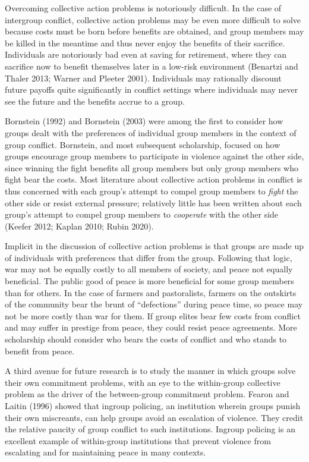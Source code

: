 \documentclass[11pt]{article}
\begin{document}
Overcoming collective action problems is notoriously difficult. In the
case of intergroup conflict, collective action problems may be even more
difficult to solve because costs must be born before benefits are
obtained, and group members may be killed in the meantime and thus never
enjoy the benefits of their sacrifice. Individuals are notoriously bad
even at saving for retirement, where they can sacrifice now to benefit
themselves later in a low-risk environment (Benartzi and Thaler 2013;
Warner and Pleeter 2001). Individuals may rationally discount future
payoffs quite significantly in conflict settings where individuals may
never see the future and the benefits accrue to a group.

Bornstein (1992) and Bornstein (2003) were among the first to consider
how groups dealt with the preferences of individual group members in the
context of group conflict. Bornstein, and most subsequent scholarship,
focused on how groups encourage group members to participate in violence
against the other side, since winning the fight benefits all group
members but only group members who fight bear the costs. Most literature
about collective action problems in conflict is thus concerned with each
group's attempt to compel group members to \emph{fight} the other side
or resist external pressure; relatively little has been written about
each group's attempt to compel group members to \emph{cooperate} with
the other side (Keefer 2012; Kaplan 2010; Rubin 2020).

Implicit in the discussion of collective action problems is that groups
are made up of individuals with preferences that differ from the group.
Following that logic, war may not be equally costly to all members of
society, and peace not equally beneficial. The public good of peace is
more beneficial for some group members than for others. In the case of
farmers and pastoralists, farmers on the outskirts of the community bear
the brunt of ``defections'' during peace time, so peace may not be more
costly than war for them. If group elites bear few costs from conflict
and may suffer in prestige from peace, they could resist peace
agreements. More scholarship should consider who bears the costs of
conflict and who stands to benefit from peace.

A third avenue for future research is to study the manner in which
groups solve their own commitment problems, with an eye to the
within-group collective problem as the driver of the between-group
commitment problem. Fearon and Laitin (1996) showed that ingroup
policing, an institution wherein groups punish their own miscreants, can
help groups avoid an escalation of violence. They credit the relative
paucity of group conflict to such institutions. Ingroup policing is an
excellent example of within-group institutions that prevent violence
from escalating and for maintaining peace in many contexts.
\end{document}
